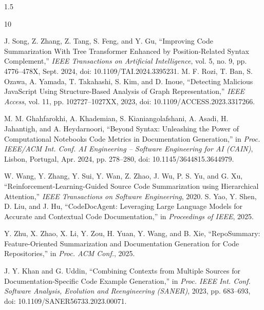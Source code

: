 \documentclass{cls/thesis}
\begin{document}
\fontsize{12}{12}\selectfont	
\pagestyle{fancy}
\begin{spacing}{1.5}
\justifying 




%
%
%
%
%
%
%


\newpage
\begin{thebibliography}{10}

J. Song, Z. Zhang, Z. Tang, S. Feng, and Y. Gu,
``Improving Code Summarization With Tree Transformer Enhanced by Position-Related Syntax Complement,''
\emph{IEEE Transactions on Artificial Intelligence}, vol. 5, no. 9, pp. 4776--478X, Sept. 2024, doi: 10.1109/TAI.2024.3395231.
M. F. Rozi, T. Ban, S. Ozawa, A. Yamada, T. Takahashi, S. Kim, and D. Inoue,
``Detecting Malicious JavaScript Using Structure-Based Analysis of Graph Representation,''
\emph{IEEE Access}, vol. 11, pp. 102727--1027XX, 2023, doi: 10.1109/ACCESS.2023.3317266.

M. M. Ghahfarokhi, A. Khademian, S. Kianiangolafshani, A. Asadi, H. Jahantigh, and A. Heydarnoori,
``Beyond Syntax: Unleashing the Power of Computational Notebooks Code Metrics in Documentation Generation,''
in \emph{Proc. IEEE/ACM Int. Conf. AI Engineering -- Software Engineering for AI (CAIN)}, Lisbon, Portugal, Apr. 2024, pp. 278--280, doi: 10.1145/3644815.3644979.

W. Wang, Y. Zhang, Y. Sui, Y. Wan, Z. Zhao, J. Wu, P. S. Yu, and G. Xu,
``Reinforcement-Learning-Guided Source Code Summarization using Hierarchical Attention,''
\emph{IEEE Transactions on Software Engineering}, 2020.
S. Yao, Y. Shen, D. Liu, and J. Hu,
``CodeDocAgent: Leveraging Large Language Models for Accurate and Contextual Code Documentation,''
in \emph{Proceedings of IEEE}, 2025.

Y. Zhu, X. Zhao, X. Li, Y. Zou, H. Yuan, Y. Wang, and B. Xie,
``RepoSummary: Feature-Oriented Summarization and Documentation Generation for Code Repositories,''
in \emph{Proc. ACM Conf.}, 2025.

J. Y. Khan and G. Uddin,
``Combining Contexts from Multiple Sources for Documentation-Specific Code Example Generation,''
in \emph{Proc. IEEE Int. Conf. Software Analysis, Evolution and Reengineering (SANER)}, 2023, pp. 683--693, doi: 10.1109/SANER56733.2023.00071.


\end{thebibliography}
\end{spacing}
\end{document}

